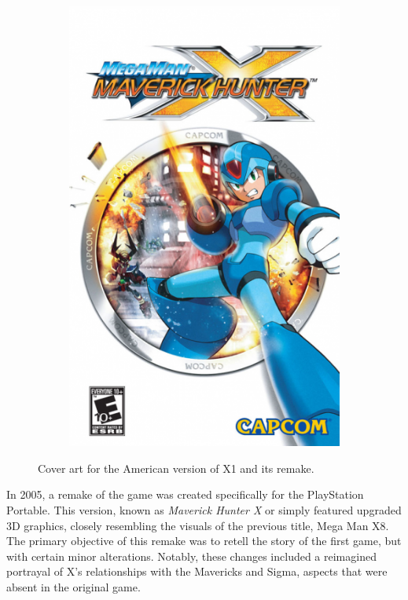 \begin{figure}[htp]
\begin{subfigure}{0.4\linewidth}
		\includegraphics[width=\linewidth]{figures/X1/mmxmh.png}
	\end{subfigure}
	\caption{Cover art for the American version of X1 and its remake.}
\end{figure}
In 2005, a remake of the game was created specifically for the PlayStation Portable. This version, known as \textit{Maverick Hunter X} or simply \mhx featured upgraded 3D graphics, closely resembling the visuals of the previous title, Mega Man X8. The primary objective of this remake was to retell the story of the first game, but with certain minor alterations. Notably, these changes included a reimagined portrayal of X's relationships with the Mavericks and Sigma, aspects that were absent in the original game.

